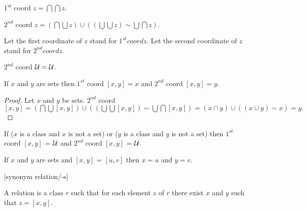 \documentclass[a4paper,draft]{amsproc}
\begin{document}
\begin{forthel}
\begin{definition}[51] $1^{st}$ coord $z = \bigcap \bigcap z$.\end{definition}

\begin{definition}[52] $2^{nd}$ coord $z = (\bigcap \bigcup z) \cup 
((\bigcup \bigcup z) \sim \bigcup \bigcap z)$.\end{definition} 
Let the first coordinate of $z$ stand for $1^{st} coord z$.
Let the second coordinate of $z$ stand for $2^{nd} coord z$.

\begin{theorem}[53]
$2^{nd}$ coord $\cal{U} = \cal{U}$.
\end{theorem}

\begin{theorem}[54a]
If $x$ and $y$ are sets 
then $1^{st}$ coord $[x,y] = x$ and $2^{nd}$ coord $[x,y] = y$.
\end{theorem}
\begin{proof}
Let $x$ and $y$ be sets.
$2^{nd}$ coord $[x,y] = (\bigcap \bigcup [x,y]) \cup 
((\bigcup \bigcup [x,y]) \sim \bigcup \bigcap [x,y])
= (x \cap y) \cup ((x \cup y) \sim x)
= y.$
\end{proof}

\begin{theorem}[54b]
If ($x$ is a class and $x$ is not a set) or ($y$ is a class and $y$ is not a set) then
$1^{st}$ coord $[x,y]$ = $\cal{U}$ and 
$2^{nd}$ coord $[x,y]$ = $\cal{U}$.
\end{theorem}

\begin{theorem}[55]
If $x$ and $y$ are sets and $[x,y]$ = $[u,v]$ then
$x = u$ and $y = v$.
\end{theorem}


[synonym relation/-s]

\begin{definition}[56] 
A relation is a class $r$ such that for each element $z$ of $r$ there exist $x$ and $y$ such that $z = [x,y]$.
\end{definition}


\end{forthel}
\end{document}
